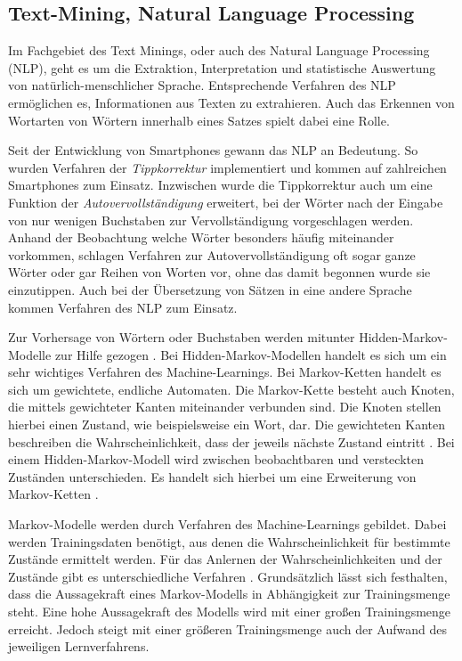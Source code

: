 
\subsection{Text-Mining, Natural Language Processing}
Im Fachgebiet des Text Minings, oder auch des Natural Language Processing (NLP), geht es um die Extraktion, Interpretation und statistische Auswertung von natürlich-menschlicher Sprache. Entsprechende Verfahren des NLP ermöglichen es, Informationen aus Texten zu extrahieren. Auch das Erkennen von Wortarten von Wörtern innerhalb eines Satzes spielt dabei eine Rolle.

Seit der Entwicklung von Smartphones gewann das NLP an Bedeutung. So wurden Verfahren der \emph{Tippkorrektur} implementiert und kommen auf zahlreichen Smartphones zum Einsatz. Inzwischen wurde die Tippkorrektur auch um eine Funktion der \emph{Autovervollständigung} erweitert, bei der Wörter nach der Eingabe von nur wenigen Buchstaben zur Vervollständigung vorgeschlagen werden. Anhand der Beobachtung welche Wörter besonders häufig miteinander vorkommen, schlagen Verfahren zur Autovervollständigung oft sogar ganze Wörter oder gar Reihen von Worten vor, ohne das damit begonnen wurde sie einzutippen. Auch bei der Übersetzung von Sätzen in eine andere Sprache kommen Verfahren des NLP zum Einsatz.

Zur Vorhersage von Wörtern oder Buchstaben werden mitunter Hidden-Markov-Modelle zur Hilfe gezogen \cite[p.~207]{jurafsky01}. Bei Hidden-Markov-Modellen handelt es sich um ein sehr wichtiges Verfahren des Machine-Learnings. Bei Markov-Ketten handelt es sich um gewichtete, endliche Automaten. Die Markov-Kette besteht auch Knoten, die mittels gewichteter Kanten miteinander verbunden sind. Die Knoten stellen hierbei einen Zustand, wie beispielsweise ein Wort, dar. Die gewichteten Kanten beschreiben die Wahrscheinlichkeit, dass der jeweils nächste Zustand eintritt \cite[p.~208 ff.]{jurafsky01}\cite[p.~318 ff.]{manning01}. Bei einem Hidden-Markov-Modell wird zwischen beobachtbaren und versteckten Zuständen unterschieden. Es handelt sich hierbei um eine Erweiterung von Markov-Ketten \cite[p.~211 ff.]{jurafsky01}. 

Markov-Modelle werden durch Verfahren des Machine-Learnings gebildet. Dabei werden Trainingsdaten benötigt, aus denen die Wahrscheinlichkeit für bestimmte Zustände ermittelt werden. Für das Anlernen der Wahrscheinlichkeiten und der Zustände gibt es unterschiedliche Verfahren \cite[p.~213 ff.]{jurafsky01}\cite[p.~326 ff.]{manning01}. Grundsätzlich lässt sich festhalten, dass die Aussagekraft eines Markov-Modells in Abhängigkeit zur Trainingsmenge steht. Eine hohe Aussagekraft des Modells wird mit einer großen Trainingsmenge erreicht. Jedoch steigt mit einer größeren Trainingsmenge auch der Aufwand des jeweiligen Lernverfahrens.

